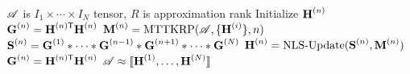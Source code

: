 \begin{algorithm}
\caption{$\CP = \text{NNCP}(\TA,R)$}
\label{alg:nncp}
\begin{algorithmic}[1]
\Require $\TA$ is $I_1\times \cdots \times I_N$ tensor, $R$ is approximation rank
\State {}
	\State Initialize $\Mn{H}{n}$ 
	\State $\Mn{G}{n} = \MnTra{H}{n}\Mn{H}{n}$
\EndFor
\State {}
	\State {}
	\State {}
	\State $\Mn{M}{n} = \text{MTTKRP}(\TA,\{\Mn{H}{i}\},n)$
		\label{line:MTTKRP}
	\State $\Mn{S}{n} = \Mn{G}{1} \Hada \cdots \Hada \Mn{G}{n-1} \Hada \Mn{G}{n+1} \Hada \cdots \Hada \Mn{G}{N}$
		\label{line:GH}
	\State $\Mn{H}{n} = \text{NLS-Update}(\Mn{S}{n},\Mn{M}{n})$
		\label{line:NLS}
	\State $\Mn{G}{n} = \MnTra{H}{n}\Mn{H}{n}$
		\label{line:Gn}
	\EndFor
\EndWhile
\Ensure $\TA \approx \CP$
\end{algorithmic}
\end{algorithm}

